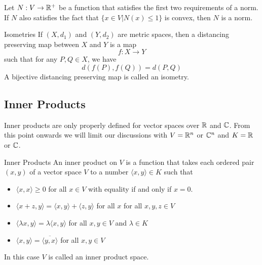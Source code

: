 \documentclass[a4paper]{article}
\begin{document}
\begin{prp}{}{} Let $N:V\to\mathbb{R}^+$ be a function that satisfies the first two requirements of a norm. If $N$ also satisfies the fact that $\{x\in V|N(x)\leq 1\}$ is convex, then $N$ is a norm. 
\end{prp}

\begin{defn}{Isometries}{} If $(X,d_1)$ and $(Y,d_2)$ are metric spaces, then a distancing preserving map between $X$ and $Y$ is a map $$f:X\to Y$$ such that for any $P,Q\in X$, we have $$d(f(P),f(Q))=d(P,Q)$$ A bijective distancing preserving map is called an isometry. 
\end{defn}


\subsection{Inner Products}
Inner products are only properly defined for vector spaces over $\mathbb{R}$ and $\mathbb{C}$. From this point onwards we will limit our discussions with $V=\mathbb{R}^n$ or $\mathbb{C}^n$ and $K=\mathbb{R}$ or $\mathbb{C}$. 
\begin{defn}{Inner Products}{} An inner product on $V$ is a function that takes each ordered pair $(x,y)$ of a vector space $V$ to a number $\langle x,y\rangle\in K$ such that 
\begin{itemize}
\item $\langle x,x\rangle\geq0$ for all $x\in V$ with equality if and only if $x=0$. 
\item $\langle x+z,y\rangle=\langle x,y\rangle+\langle z,y\rangle$ for all $x$ for all $x,y,z\in V$
\item $\langle \lambda x,y\rangle=\lambda\langle x,y\rangle$ for all $x,y\in V$ and $\lambda\in K$
\item $\langle x,y\rangle=\overline{\langle y,x\rangle}$ for all $x,y\in V$
\end{itemize}
In this case $V$ is called an inner product space. 
\end{defn}
\end{document}
